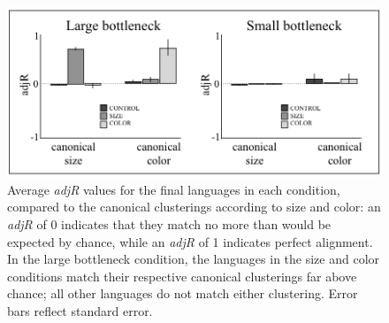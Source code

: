 \documentclass{apa}
\begin{document}
%
%
%
%
%
%



\begin{figure}
\begin{center}
\includegraphics[scale=0.45]{adjrandvalues3.png}
\end{center}
\vspace{-5mm}
\caption{Average {\it adjR} values for the final languages in each condition, compared to the canonical clusterings according to size and color: an {\it adjR} of 0 indicates that they match no more than would be expected by chance, while an {\it adjR} of 1 indicates perfect alignment. In the {\sc large bottleneck} condition, the languages in the {\sc size} and {\sc color} conditions match their respective canonical clusterings far above chance; all other languages do not match either clustering. Error bars reflect standard error.}
\label{fig:adjR}
\end{figure}
\end{document}

